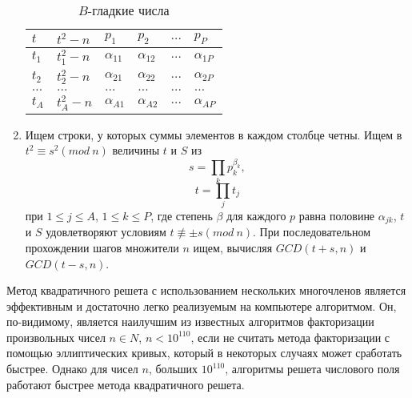 \begin{enumerate}
        \begin{table}[h]
        \centering
          \begin{tabular}{|l|l|l|l|l|l|}
            \hline
            $t$       & $t^2-n$       & $p_1$          & $p_2$          & $\dots$  & $p_P$  \\ \hline
            $t_1$     & $t^{2}_1-n$   & $\alpha_{11}$  & $\alpha_{12}$  & $\dots$  & $\alpha_{1P}$  \\ \hline
            $t_2$     & $t^{2}_2-n$   & $\alpha_{21}$  & $\alpha_{22}$  & $\dots$  & $\alpha_{2P}$  \\ \hline
            $\dots$   & $\dots$       & $\dots$        & $\dots$        & $\dots$  & $\dots$  \\ \hline
            $t_A$     & $t^{2}_A-n$   & $\alpha_{A1}$  & $\alpha_{A2}$  & $\dots$  & $\alpha_{AP}$ \\ \hline
          \end{tabular}
          \caption{$B$-гладкие числа}
          \label{table-quadric-sieve}
        \end{table}

    \item Ищем строки, у которых суммы элементов в каждом столбце четны. Ищем в $t^2 \equiv s^2 (mod \: n)$ величины $t$ и $S$ 
      из 
        \begin{equation}
          s=\prod_{k}{p^{\beta_k}_k}, 
        \end{equation}
        \begin{equation}
          t=\prod_{j}{t_j}
        \end{equation}
      при $1 \le j \le A$, $1 \le k \le P$, где степень $\beta$ для каждого $p$ равна 
      половине $\alpha_{jk}$, $t$ и $S$ удовлетворяют условиям $t \not\equiv \pm s(mod \: n)$. При последовательном прохождении шагов множители $n$ 
      ищем, вычисляя $GCD(t + s, n)$ и $GCD(t - s, n)$.
  \end{enumerate}

  Метод квадратичного решета с использованием нескольких многочленов является эффективным и достаточно легко реализуемым на компьютере алгоритмом. Он, 
по-видимому, является наилучшим из известных алгоритмов факторизации произвольных чисел $n \in N$, $n < 10^{110}$, если не считать метода факторизации с помощью эллиптических кривых, который в некоторых случаях может сработать быстрее. Однако для чисел $n$, больших $10^{110}$, алгоритмы
решета числового поля работают быстрее метода квадратичного решета.


